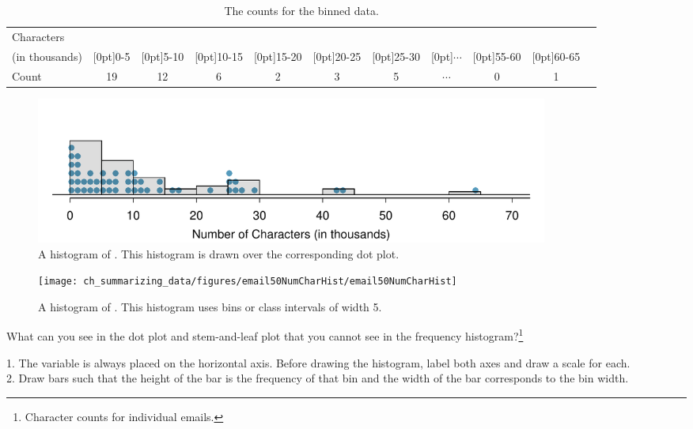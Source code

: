 \begin{table}[ht]
\centering\small
\begin{tabular}{l ccc ccc ccc c}
  \hline
Characters & \\
(in thousands) & \raisebox{1.5ex}[0pt]{0-5} & \raisebox{1.5ex}[0pt]{5-10} & \raisebox{1.5ex}[0pt]{10-15} & \raisebox{1.5ex}[0pt]{15-20} & \raisebox{1.5ex}[0pt]{20-25} & \raisebox{1.5ex}[0pt]{25-30} & \raisebox{1.5ex}[0pt]{$\cdots$} & \raisebox{1.5ex}[0pt]{55-60} & \raisebox{1.5ex}[0pt]{60-65} \\
  \hline
Count & 19 & 12 & 6 & 2 & 3 & 5 & $\cdots$ & 0 & 1 \\
  \hline
\end{tabular}
\caption{The counts for the binned  data.}
\label{binnedNumCharTable}
\end{table}

\begin{figure}[bth]
   \centering
   \includegraphics[width=0.82\textwidth]{ch_summarizing_data/figures/emailCharactersDotPlot/emailCharactersDotPlotStackedRoundedHist}
   \caption{A histogram of . This histogram is drawn over the corresponding dot plot.}
   \label{emailCharactersDotPlotStackedRoundedHist}
\end{figure}

\begin{figure}[bth]
   \centering
   \texttt{[image: ch\_summarizing\_data/figures/email50NumCharHist/email50NumCharHist]}
   \caption{A histogram of . This histogram uses bins or class intervals of width 5.}
   \label{email50NumCharHist}
\end{figure}

\begin{exercise}
What can you see in the dot plot and stem-and-leaf plot that you cannot see in the frequency histogram?\footnote{Character counts for individual emails.}
\end{exercise}

\begin{tipBox}{
1. The variable is always placed on the horizontal axis. Before drawing the histogram, label both axes and draw a scale for each. \\[2mm]
2. Draw bars such that the height of the bar is the frequency of that bin and the width of the bar corresponds to the bin width.}
\end{tipBox}

